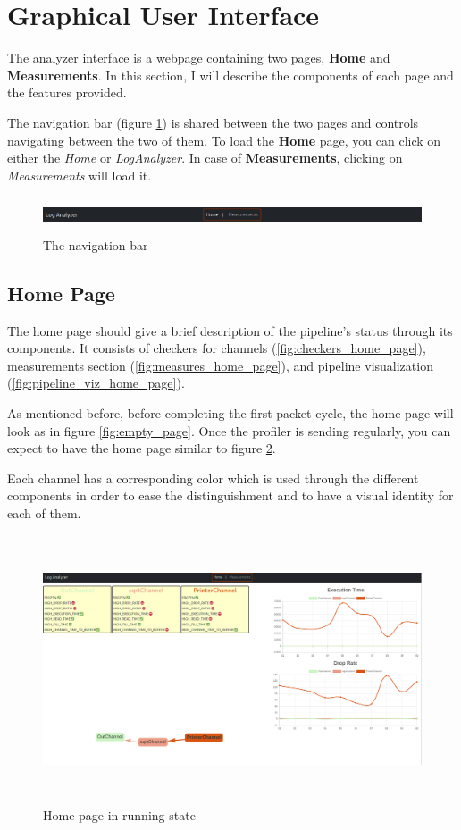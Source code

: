 \section{Graphical User Interface}\label{sec:GUI}
The analyzer interface is a webpage containing two pages, \textbf{Home} and \textbf{Measurements}. In this
section, I will describe the components of each page and the features provided.

The navigation bar (figure \ref{fig:nav_bar}) is shared between the two pages and controls navigating
between the two of them. To load the \textbf{Home} page, you can click on either the \textit{Home} or
\textit{LogAnalyzer}. In case of \textbf{Measurements}, clicking on \textit{Measurements} will load it.
\newline
\begin{figure}[H]
	\centering
	\includegraphics[width=1.1\textwidth,height=40px]{images/nav_bar.png}
	\caption{The navigation bar}
	\label{fig:nav_bar}
\end{figure}

\subsection{Home Page}
The home page should give a brief description of the pipeline's status through its components. It consists
of checkers for channels (\ref{fig:checkers_home_page}), measurements section (\ref{fig:measures_home_page}), 
and pipeline visualization (\ref{fig:pipeline_viz_home_page}).

As mentioned before, before completing the first packet cycle, the home page will look as in figure \ref{fig:empty_page}.
Once the profiler is sending regularly, you can expect to have the home page similar to figure \ref{fig:home_page_running_state}.

Each channel has a corresponding color which is used through the different components in order to ease the
distinguishment and to have a visual identity for each of them.
\newline
\begin{figure}[H]
	\centering
	\includegraphics[width=1.0\textwidth,height=300px]{images/home_page_in_running_state.png}
	\caption{Home page in running state}
	\label{fig:home_page_running_state}
\end{figure}

